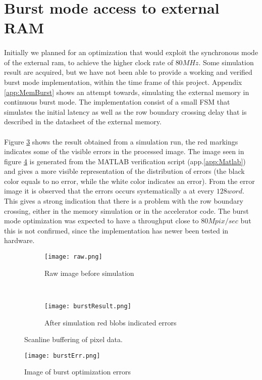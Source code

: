 \section{Burst mode access to external RAM}
\paragraph*{}
Initially we planned for an optimization that would exploit the synchronous mode of the external ram, to achieve the higher clock rate of $80MHz$. Some simulation result are acquired, but we have not been able to provide a working and verified burst mode implementation, within the time frame of this project. Appendix \ref{app:MemBurst} shows an attempt towards, simulating the external memory in continuous burst mode. The implementation consist of a small FSM that simulates the initial latency as well as the row boundary crossing delay that is described in the datasheet \cite{Micron:CellularRAM} of the external memory.
\paragraph*{}
Figure \ref{fig:burst_picture} shows the result obtained from a simulation run, the red markings indicates some of the visible errors in the processed image. The image seen in figure \ref{fig:pic_burst_err} is generated from the MATLAB verification script (app.\ref{app:Matlab}) and gives a more visible representation of the distribution of errors (the black color equals to no error, while the white color indicates an error). From the error image it is observed that the errors occurs systematically a at every $128word$. This gives a strong indication that there is a problem with the row boundary crossing, either in the memory simulation or in the accelerator code.  The burst mode optimization was expected to have a throughput close to $80M pix/sec$ but this is not confirmed, since the implementation has newer been tested in hardware.
     
\begin{figure}[H]
	\centering
	\begin{subfigure}[b]{0.5\textwidth}
		\texttt{[image: raw.png]}
		\caption{Raw image before simulation}
		\label{fig:raw_burst}
    \end{subfigure}%
        ~ %
    \begin{subfigure}[b]{0.5\textwidth}
    	\texttt{[image: burstResult.png]}
    	\caption{After simulation red blobs indicated errors}
    	\label{fig:burst_picture_sobel}
	\end{subfigure}
	\caption{Scanline buffering of pixel data.}
    	\label{fig:burst_picture}
\end{figure}


\begin{figure}[H]
	\centering
	\texttt{[image: burstErr.png]}
	\caption{Image of burst optimization errors}
	\label{fig:pic_burst_err}
\end{figure}